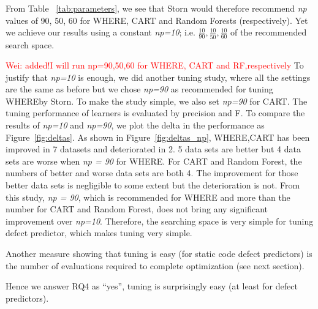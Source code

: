 \documentclass{sig-alternative}
\newcommand{\wei}[1]{\textcolor{red}{Wei: #1}}
\newcommand{\fig}[1]{Figure~\ref{fig:#1}}
\newcommand{\tab}[1]{Table ~\ref{tab:#1}}
\begin{document}
From \tab{parameters},
we see that Storn would therefore recommend {\em np} values of
90, 50, 60 for WHERE, CART and Random Forests (respectively). Yet we achieve our results
using a constant {\em np=10}; i.e. $\frac{10}{90}, \frac{10}{50}, \frac{10}{60}$ of the
recommended search space.

\wei{added!I will run np=90,50,60 for WHERE, CART and RF,respectively} To justify that {\em np=10} is enough, we did another tuning study, 
where all the settings are the same as before but we chose {\em np=90} as recommended for tuning WHEREby Storn. 
To make the study simple, we also set {\em np=90} for CART. The tuning performance of learners is evaluated
by precision and F. To compare the results of {\em np=10} and {\em np=90}, we plot the delta in the performance as \fig{deltas}. As shown in \fig{deltas_np}, WHERE,CART has been improved in 7 datasets and deteriorated in 2. 5 data sets are better but 4 data sets are worse when {\em np = 90} for WHERE. For CART and Random Forest, the numbers of better and worse data sets are both 4. The improvement for those better data sets is negligible to some extent but the deterioration is not. From this study, {\em np = 90}, which is recommended for WHERE and more than the number for CART and Random Forest, does not bring any significant improvement over {\em np=10}. Therefore, the searching space is very simple for tuning defect predictor, which makes tuning very simple.


Another measure showing that tuning is easy 
(for static code defect predictors)
is the number of evaluations required to complete optimization
(see next section).

Hence we answer RQ4 as ``yes'', tuning is surprisingly easy (at least
for defect predictors).





  
\end{document}
